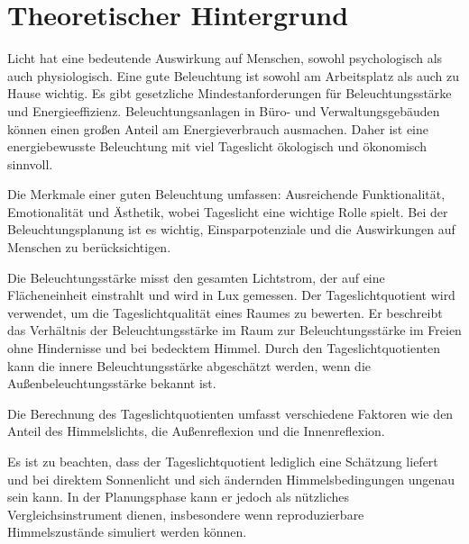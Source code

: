 \section{Theoretischer Hintergrund}
Licht hat eine bedeutende Auswirkung auf Menschen, sowohl psychologisch als auch physiologisch. Eine gute Beleuchtung ist sowohl am Arbeitsplatz als auch zu Hause wichtig. Es gibt gesetzliche Mindestanforderungen für Beleuchtungsstärke und Energieeffizienz. Beleuchtungsanlagen in Büro- und Verwaltungsgebäuden können einen großen Anteil am Energieverbrauch ausmachen. Daher ist eine energiebewusste Beleuchtung mit viel Tageslicht ökologisch und ökonomisch sinnvoll.

Die Merkmale einer guten Beleuchtung umfassen: Ausreichende Funktionalität, Emotionalität und Ästhetik, wobei Tageslicht eine wichtige Rolle spielt. Bei der Beleuchtungsplanung ist es wichtig, Einsparpotenziale und die Auswirkungen auf Menschen zu berücksichtigen.

Die Beleuchtungsstärke misst den gesamten Lichtstrom, der auf eine Flächeneinheit einstrahlt und wird in Lux gemessen. Der Tageslichtquotient wird verwendet, um die Tageslichtqualität eines Raumes zu bewerten. Er beschreibt das Verhältnis der Beleuchtungsstärke im Raum zur Beleuchtungsstärke im Freien ohne Hindernisse und bei bedecktem Himmel. Durch den Tageslichtquotienten kann die innere Beleuchtungsstärke abgeschätzt werden, wenn die Außenbeleuchtungsstärke bekannt ist.

Die Berechnung des Tageslichtquotienten umfasst verschiedene Faktoren wie den Anteil des Himmelslichts, die Außenreflexion und die Innenreflexion.

Es ist zu beachten, dass der Tageslichtquotient lediglich eine Schätzung liefert und bei direktem Sonnenlicht und sich ändernden Himmelsbedingungen ungenau sein kann. In der Planungsphase kann er jedoch als nützliches Vergleichsinstrument dienen, insbesondere wenn reproduzierbare Himmelszustände simuliert werden können.